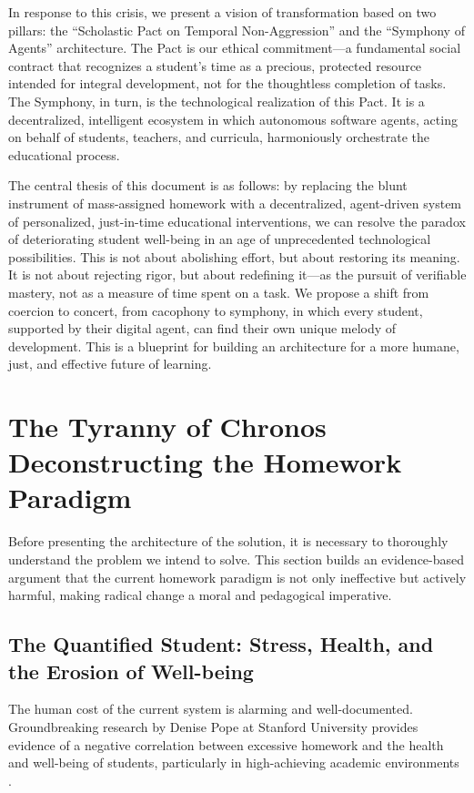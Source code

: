 \documentclass[12pt,a4paper]{article}
\begin{document}
In response to this crisis, we present a vision of transformation based on two pillars: the \enquote{Scholastic Pact on Temporal Non-Aggression} and the \enquote{Symphony of Agents} architecture. The Pact is our ethical commitment---a fundamental social contract that recognizes a student's time as a precious, protected resource intended for integral development, not for the thoughtless completion of tasks. The Symphony, in turn, is the technological realization of this Pact. It is a decentralized, intelligent ecosystem in which autonomous software agents, acting on behalf of students, teachers, and curricula, harmoniously orchestrate the educational process.

The central thesis of this document is as follows: by replacing the blunt instrument of mass-assigned homework with a decentralized, agent-driven system of personalized, just-in-time educational interventions, we can resolve the paradox of deteriorating student well-being in an age of unprecedented technological possibilities. This is not about abolishing effort, but about restoring its meaning. It is not about rejecting rigor, but about redefining it---as the pursuit of verifiable mastery, not as a measure of time spent on a task. We propose a shift from coercion to concert, from cacophony to symphony, in which every student, supported by their digital agent, can find their own unique melody of development. This is a blueprint for building an architecture for a more humane, just, and effective future of learning.

\section[The Tyranny of Chronos: Deconstructing the Homework Paradigm]{The Tyranny of Chronos\\Deconstructing the Homework Paradigm}
Before presenting the architecture of the solution, it is necessary to thoroughly understand the problem we intend to solve. This section builds an evidence-based argument that the current homework paradigm is not only ineffective but actively harmful, making radical change a moral and pedagogical imperative.

\subsection{The Quantified Student: Stress, Health, and the Erosion of Well-being}
The human cost of the current system is alarming and well-documented. Groundbreaking research by Denise Pope at Stanford University provides evidence of a negative correlation between excessive homework and the health and well-being of students, particularly in high-achieving academic environments \autocite{pope2013,pope_health}.
\end{document}
